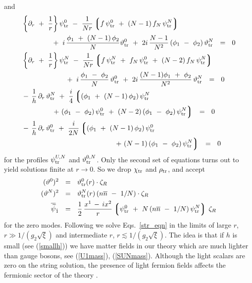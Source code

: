 \documentclass[12pt]{article}
\newcommand{\p}{\partial}
\newcommand{\wt}{\widetilde}
\newcommand{\ov}{\overline}
\newcommand{\lgr}{\left\lgroup}
\newcommand{\rgr}{\right\rgroup}
\newcommand{\zr}{\zeta_R}
\newcommand{\nbar}{\ov{n}}
\newcommand{\pts}{\psi_{\rm tr}^0}
\newcommand{\ptN}{\psi_{\rm tr}^N}
\newcommand{\tts}{\vartheta_{\rm tr}^0}
\newcommand{\ttN}{\vartheta_{\rm tr}^N}
\begin{document}
	and 
\begin{align}
\label{str_eqn}
%
\notag
	&
	\left\{ \p_r ~+~ \frac{1}{r} \right\} \pts ~-~ \frac{1}{Nr}\lgr f\,\pts ~+~ (N-1)\, f_N\, \ptN \rgr \\
\notag
	&
	\qquad\qquad
		~+~ i\, \frac{ \phi_1 ~+~ (N-1)\,\phi_2}{N} \tts 
		~+~ 2i\, \frac{N-1}{N^2}\, (\phi_1 ~-~ \phi_2)\, \ttN ~~=~~ 0
\\
%
\notag
	&
	\left\{ \p_r ~+~ \frac{1}{r} \right\} \ptN ~-~ \frac{1}{Nr} \lgr f\, \ptN ~+~ f_N\, \pts ~+~ (N-2)\,f_N\,\ptN \rgr \\
	& 
	\qquad\qquad\qquad
		~+~ i\, \frac{\phi_1 ~-~ \phi_2}{N}\, \tts 
		~+~ 2i\, \frac{(N-1)\phi_1 ~+~ \phi_2}{N^2}\, \ttN ~~=~~ 0
\\
%
\notag
	&
	-\,\frac{1}{h}\, \p_r\, \ttN 
		~+~ \frac{i}{4} \lgr (\phi_1 ~+~ (N-1)\,\phi_2)\,\ptN \right. \\
\notag
	&
	\qquad\qquad
		\left.
		~+~ (\phi_1~-~\phi_2)\,\pts ~+~ (N-2)\,(\phi_1~-~\phi_2)\,\ptN \rgr ~~=~~ 0
\\
%
\notag
	&
	-\,\frac{1}{h}\, \p_r\, \tts 
		~+~ \frac{i}{2N} \lgr (\phi_1 ~+~ (N-1)\,\phi_2)\,\pts \right. \\
\notag
	&
	\qquad\qquad\qquad\qquad\qquad\qquad\quad
		\left.
		~+~ (N-1)\,(\phi_1~-~\phi_2)\,\ptN \rgr ~~=~~0
\end{align}
	for the profiles $ \psi_{\rm tr}^{U,N} $ and $ \vartheta_{\rm tr}^{0,N} $.
	Only the second set of equations turns out to yield solutions finite at $ r \to 0 $.
	So we drop $ \chi_{\rm tr} $ and $ \rho_{\rm tr} $, and accept
\begin{align}
%
\notag
	(\vartheta^0)^2 & ~~=~~ \tts(r) \cdot \zr 
\\
%
\label{tr_anz}
	(\vartheta^N)^2 & ~~=~~ \ttN(r)\, (n\nbar ~-~ 1/N) \cdot \zr
\\
%
\notag
	\ov{\wt{\psi}}{}_{\dot 1} & ~~=~~ \frac{1}{2}\, \frac{x^1 \,-\, ix^2}{r} 
						\lgr \pts ~+~ N\,(n\nbar ~-~ 1/N)\, \ptN \rgr \, \zr
\end{align}
	for the zero modes.
	Following \cite{GSYmmodel,BSYhet} we solve Eqs.~\eqref{str_eqn} in the limits of large $r$,
	$ r \gg 1/(g_2\sqrt{\xi}) $ and intermediate $r$, $ r \lesssim 1/(g_2\sqrt{\xi}) $.
 The idea is that if $h$ is small (see (\ref{smallh})) we have  matter fields in our theory
which are much lighter than  gauge bosons, see (\ref{U1mass}), (\ref{SUNmass}). 
Although the light scalars are zero on the string solution, 
the presence of light fermion fields affects the fermionic sector of the theory \cite{SYnone,SYhet}.
\end{document}
